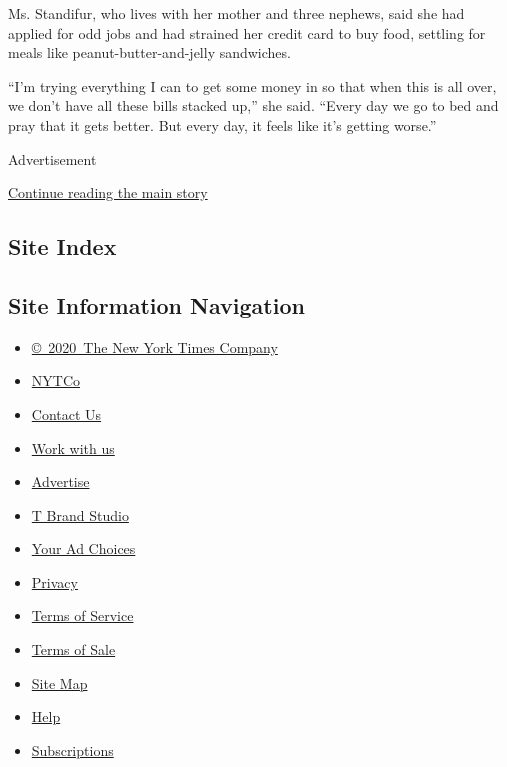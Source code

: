 Ms. Standifur, who lives with her mother and three nephews, said she had
applied for odd jobs and had strained her credit card to buy food,
settling for meals like peanut-butter-and-jelly sandwiches.

``I'm trying everything I can to get some money in so that when this is
all over, we don't have all these bills stacked up,'' she said. ``Every
day we go to bed and pray that it gets better. But every day, it feels
like it's getting worse.''

Advertisement

\protect\hyperlink{after-bottom}{Continue reading the main story}

\hypertarget{site-index}{%
\subsection{Site Index}\label{site-index}}

\hypertarget{site-information-navigation}{%
\subsection{Site Information
Navigation}\label{site-information-navigation}}

\begin{itemize}
\tightlist
\item
  \href{https://help.nytimes3xbfgragh.onion/hc/en-us/articles/115014792127-Copyright-notice}{©~2020~The
  New York Times Company}
\end{itemize}

\begin{itemize}
\tightlist
\item
  \href{https://www.nytco.com/}{NYTCo}
\item
  \href{https://help.nytimes3xbfgragh.onion/hc/en-us/articles/115015385887-Contact-Us}{Contact
  Us}
\item
  \href{https://www.nytco.com/careers/}{Work with us}
\item
  \href{https://nytmediakit.com/}{Advertise}
\item
  \href{http://www.tbrandstudio.com/}{T Brand Studio}
\item
  \href{https://www.nytimes3xbfgragh.onion/privacy/cookie-policy\#how-do-i-manage-trackers}{Your
  Ad Choices}
\item
  \href{https://www.nytimes3xbfgragh.onion/privacy}{Privacy}
\item
  \href{https://help.nytimes3xbfgragh.onion/hc/en-us/articles/115014893428-Terms-of-service}{Terms
  of Service}
\item
  \href{https://help.nytimes3xbfgragh.onion/hc/en-us/articles/115014893968-Terms-of-sale}{Terms
  of Sale}
\item
  \href{https://spiderbites.nytimes3xbfgragh.onion}{Site Map}
\item
  \href{https://help.nytimes3xbfgragh.onion/hc/en-us}{Help}
\item
  \href{https://www.nytimes3xbfgragh.onion/subscription?campaignId=37WXW}{Subscriptions}
\end{itemize}
